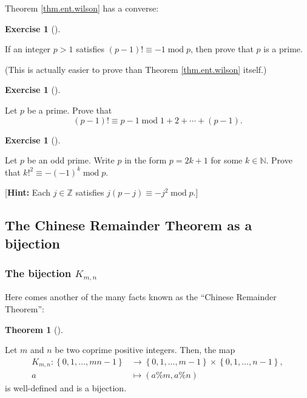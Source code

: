 \documentclass[numbers=enddot,12pt,final,onecolumn,notitlepage]{scrartcl}%
\newcounter{exer}
\numberwithin{exer}{subsection}
\theoremstyle{definition}
\newtheorem{theo}{Theorem}[subsection]
\newenvironment{theorem}[1][]
{\begin{theo}[#1]\begin{leftbar}}
{\end{leftbar}\end{theo}}
\newtheorem{exmp}[exer]{Exercise}
\newenvironment{exercise}[1][]
{\begin{exmp}[#1]\begin{leftbar}}
{\end{leftbar}\end{exmp}}
\begin{document}
Theorem \ref{thm.ent.wilson} has a converse:

\begin{exercise}
\label{exe.ent.wilson.converse}If an integer $p>1$ satisfies $\left(
p-1\right)  !\equiv-1\operatorname{mod}p$, then prove that $p$ is a prime.
\end{exercise}

(This is actually easier to prove than Theorem \ref{thm.ent.wilson} itself.)

\begin{exercise}
\label{exe.ent.wilson.gauss}Let $p$ be a prime. Prove that
\[
\left(  p-1\right)  !\equiv p-1\operatorname{mod}1+2+\cdots+\left(
p-1\right)  .
\]

\end{exercise}

\begin{exercise}
\label{exe.ent.wilson.-1qr}Let $p$ be an odd prime. Write $p$ in the form
$p=2k+1$ for some $k\in\mathbb{N}$. Prove that $k!^{2}\equiv-\left(
-1\right)  ^{k}\operatorname{mod}p$.

[\textbf{Hint:} Each $j\in\mathbb{Z}$ satisfies $j\left(  p-j\right)
\equiv-j^{2}\operatorname{mod}p$.]
\end{exercise}

\subsection{The Chinese Remainder Theorem as a bijection}

\subsubsection{The bijection $K_{m,n}$}

Here comes another of the many facts known as the \textquotedblleft Chinese
Remainder Theorem\textquotedblright:

\begin{theorem}
\label{thm.ent.CRT-bij}Let $m$ and $n$ be two coprime positive integers. Then,
the map%
\begin{align*}
K_{m,n}:\left\{  0,1,\ldots,mn-1\right\}   &  \rightarrow\left\{
0,1,\ldots,m-1\right\}  \times\left\{  0,1,\ldots,n-1\right\}  ,\\
a  &  \mapsto\left(  a\%m,a\%n\right)
\end{align*}
is well-defined and is a bijection.
\end{theorem}
\end{document}
